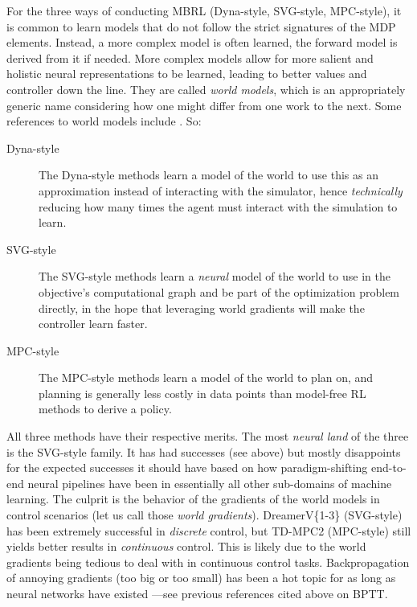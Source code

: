 \documentclass[12pt,a4paper]{article}
\begin{document}
For the three ways of conducting MBRL (Dyna-style, SVG-style, MPC-style),
it is common to learn models that do not follow the strict signatures of the MDP elements.
Instead, a more complex model is often learned, the forward model is derived from it if needed.
More complex models allow for more salient and holistic neural representations to be learned,
leading to better values and controller down the line. They are called \emph{world models},
which is an appropriately generic name considering how one might differ from one work to the next.
Some references to world models include
\cite{Ha2018-sa, Hafner2018-zm, Hessel2021-ah, Micheli2023-mr, Ding2024-oq, Alonso2024-jo}.
So:
\begin{description}
    \item[Dyna-style]
        The Dyna-style methods learn a model of the world to use this as an approximation
        instead of interacting with the simulator, hence \emph{technically} reducing how many times
        the agent must interact with the simulation to learn.
    \item[SVG-style]
        The SVG-style methods learn a \emph{neural} model of the world to use in the objective's
        computational graph and be part of the optimization problem directly,
        in the hope that leveraging world gradients will make the controller learn faster.
    \item[MPC-style]
        The MPC-style methods learn a model of the world to plan on, and planning is generally
        less costly in data points than model-free RL methods to derive a policy.
\end{description}

All three methods have their respective merits.
The most \textit{neural land} of the three is the SVG-style family.
It has had successes (see above) but mostly disappoints for the expected successes
it should have based on how paradigm-shifting end-to-end neural pipelines have been in essentially
all other sub-domains of machine learning.
The culprit is the behavior of the gradients of the world models in control scenarios
(let us call those \textit{world gradients}).
DreamerV\{1-3\} (SVG-style) has been extremely successful in \emph{discrete} control,
but TD-MPC2 (MPC-style) still yields better results in \emph{continuous} control.
This is likely due to the world gradients being tedious to deal with in continuous control tasks.
Backpropagation of annoying gradients (too big or too small) has been a hot topic for as long
as neural networks have existed ---see previous references cited above on BPTT.
\end{document}
